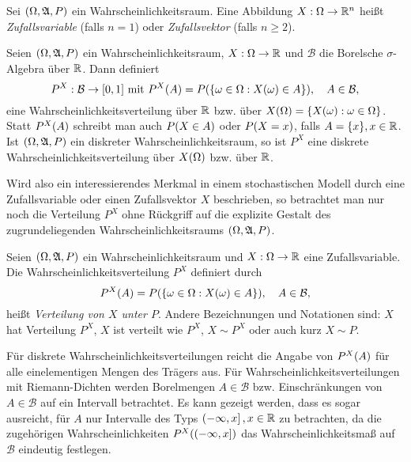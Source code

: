 \documentclass{lecture}
\begin{document}
    \begin{definition}
        Sei \(\parentheses*{\Omega, \mathfrak{A}, P}\) ein Wahrscheinlichkeitsraum.
        Eine Abbildung \(X: \Omega \to \R^n\) heißt \emph{Zufallsvariable} (falls \(n = 1\)) oder \emph{Zufallsvektor} (falls \(n \ge 2\)).
    \end{definition}

    \begin{lemma}
        Seien \(\parentheses*{\Omega, \mathfrak{A}, P}\) ein Wahrscheinlichkeitsraum, \(X: \Omega \to \R\) und \(\mathcal{B}\) die Borelsche \(\sigma\)-Algebra über \(\R\).
        Dann definiert
        \[
            P^X: \mathcal{B} \to \brackets*{0, 1}\text{ mit }P^X\parentheses*{A} = P\parentheses*{\braces*{\omega \in \Omega : X\parentheses*{\omega} \in A}}, \quad A \in \mathcal{B},
        \]
        eine Wahrscheinlichkeitsverteilung über \(\R\) bzw. über \(X\parentheses*{\Omega} = \braces*{X\parentheses*{\omega} : \omega \in \Omega}\).
        Statt \(P^X\parentheses*{A}\) schreibt man auch \(P\parentheses*{X \in A}\) oder \(P\parentheses*{X = x}\), falls \(A = \braces*{x}, x \in \R\).
        Ist \(\parentheses*{\Omega, \mathfrak{A}, P}\) ein diskreter Wahrscheinlichkeitsraum, so ist \(P^X\) eine diskrete Wahrscheinlichkeitsverteilung über \(X\parentheses*{\Omega}\) bzw. über \(\R\).
    \end{lemma}

    Wird also ein interessierendes Merkmal in einem stochastischen Modell durch eine Zufallsvariable oder einen Zufallsvektor \(X\) beschrieben, so betrachtet man nur noch die Verteilung \(P^X\) ohne Rückgriff auf die explizite Gestalt des zugrundeliegenden Wahrscheinlichkeitsraums \(\parentheses*{\Omega, \mathfrak{A}, P}\).

    \begin{definition}
        Seien \(\parentheses*{\Omega, \mathfrak{A}, P}\) ein Wahrscheinlichkeitsraum und \(X: \Omega \to \R\) eine Zufallsvariable.
        Die Wahrscheinlichkeitsverteilung \(P^X\) definiert durch
        \[
            P^X\parentheses*{A} = P\parentheses*{\braces*{\omega \in \Omega : X\parentheses*{\omega} \in A}}, \quad A \in \mathcal{B},
        \]
        heißt \emph{Verteilung von \(X\) unter \(P\)}.
        Andere Bezeichnungen und Notationen sind: \(X\) hat Verteilung \(P^X\), \(X\) ist verteilt wie \(P^X\), \(X \sim P^X\) oder auch kurz \(X \sim P\).
    \end{definition}

    \begin{remark}
        Für diskrete Wahrscheinlichkeitsverteilungen reicht die Angabe von \(P^X\parentheses*{A}\) für alle einelementigen Mengen des Trägers aus.
        Für Wahrscheinlichkeitsverteilungen mit Riemann-Dichten werden Borelmengen \(A \in \mathcal{B}\) bzw. Einschränkungen von \(A \in \mathcal{B}\) auf ein Intervall betrachtet.
        Es kann gezeigt werden, dass es sogar ausreicht, für \(A\) nur Intervalle des Typs \(\left(-\infty, x\right], x \in \R\) zu betrachten, da die zugehörigen Wahrscheinlichkeiten \(P^X\parentheses*{\left(-\infty, x\right]}\) das Wahrscheinlichkeitsmaß auf \(\mathcal{B}\) eindeutig festlegen.
    \end{remark}
\end{document}
